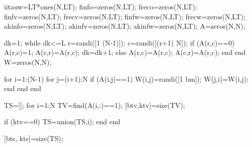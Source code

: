                 iitauw=LT*ones(N,LT);                 
                finfo=zeros(N,LT);               
                freco=zeros(N,LT);
                finfv=zeros(N,LT);               
                frecv=zeros(N,LT);                
                finfw=zeros(N,LT);               
                frecw=zeros(N,LT);                        
                akinfo=zeros(N,LT);
                akinfv=zeros(N,LT);
                akinfw=zeros(N,LT);
                A=zeros(N,N);
                              
                dk=1;
                while dk<=L
                        r=randi([1 (N-1)]);
                        c=randi([(r+1) N]);
                        if (A(r,c)==0)
                              A(r,c)=1;
                              A(c,r)=A(r,c);
                              dk=dk+1;
                        else
                              A(r,c)=A(r,c);
                              A(c,r)=A(r,c);                             
                        end
                end                                                         
                W=zeros(N,N); %
                
                for i=1:(N-1)
                    for j=(i+1):N
                        if (A(i,j)==1)
                            W(i,j)=randi([1 bm]);
                            W(j,i)=W(i,j);
                        end
                    end
                end
                        
                TS=[];
                for i=1:N
                    TV=find(A(i,:)==1);
                    [btv,ktv]=size(TV);
                    
                    if (ktv==0)
                          TS=union(TS,i);  %
                    end
                end
                
                [bts, kts]=size(TS); %
                
